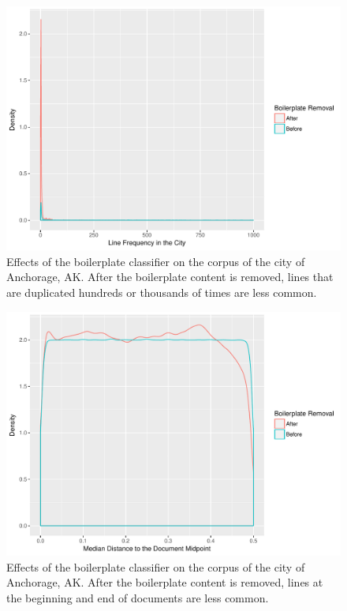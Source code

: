 \documentclass[11pt]{article}
\begin{document}
\begin{figure}[htp]
	\centering
	\caption{Effects of the boilerplate classifier on the corpus of the city of Anchorage, AK. After the boilerplate content is removed, lines that are duplicated hundreds or thousands of times are less common.}
	\label{boilerplate_before_after3}
	\includegraphics[width=\linewidth]{figures/boilerplateBeforeAfterFreq.pdf}
\end{figure}
\begin{figure}[htp]
	\centering
	\caption{Effects of the boilerplate classifier on the corpus of the city of Anchorage, AK. After the boilerplate content is removed, lines at the beginning and end of documents are less common.}
	\label{boilerplate_before_after4}
	\includegraphics[width=\linewidth]{figures/boilerplateBeforeAfterMedianDocMidDist.pdf}
\end{figure}
\end{document}
